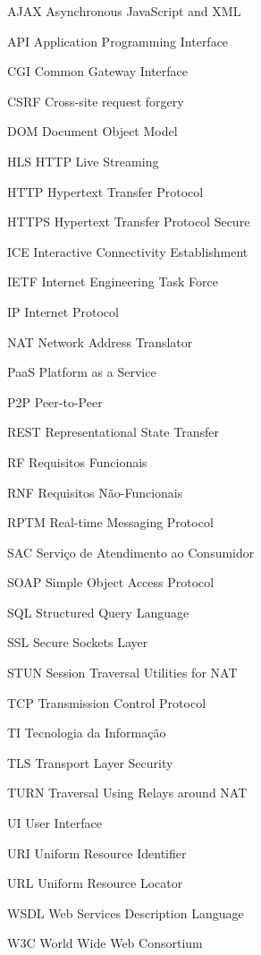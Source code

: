 \begin{siglas}
  \item[AJAX] Asynchronous JavaScript and XML
  \item[API] Application Programming Interface
  \item[CGI] Common Gateway Interface
  \item[CSRF] Cross-site request forgery 
  \item[DOM] Document Object Model
  \item[HLS] HTTP Live Streaming
  \item[HTTP] Hypertext Transfer Protocol
  \item[HTTPS] Hypertext Transfer Protocol Secure
  \item[ICE] Interactive Connectivity Establishment
  \item[IETF] Internet Engineering Task Force
  \item[IP] Internet Protocol
  \item[NAT] Network Address Translator
  \item[PaaS] Platform as a Service
  \item[P2P] Peer-to-Peer
  \item[REST] Representational State Transfer
  \item[RF] Requisitos Funcionais
  \item[RNF] Requisitos Não-Funcionais
  \item[RPTM] Real-time Messaging Protocol
  \item[SAC] Serviço de Atendimento ao Consumidor
  \item[SOAP] Simple Object Access Protocol
  \item[SQL] Structured Query Language
  \item[SSL] Secure Sockets Layer
  \item[STUN] Session Traversal Utilities for NAT
  \item[TCP] Transmission Control Protocol
  \item[TI] Tecnologia da Informação
  \item[TLS] Transport Layer Security
  \item[TURN] Traversal Using Relays around NAT
  \item[UI] User Interface
  \item[URI] Uniform Resource Identifier
  \item[URL] Uniform Resource Locator
  \item[WSDL] Web Services Description Language
  \item[W3C] World Wide Web Consortium
\end{siglas}
\cleardoublepage

